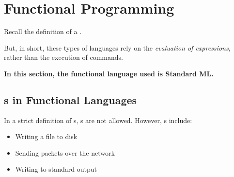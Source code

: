 \section{Functional Programming}\label{sec:Functional_Programming}
Recall the definition of a .

But, in short, these types of languages rely on the \emph{evaluation of expressions}, rather than the execution of commands.

\begin{large}
  \textbf{In this section, the functional language used is Standard ML.}
\end{large}

\subsection{s in Functional Languages}\label{subsec:Functional_Function_Side_Effects}
In a strict definition of s, s are not allowed.
However, s include:
\begin{itemize}[noitemsep]
\item Writing a file to disk
\item Sending packets over the network
\item Writing to standard output
\end{itemize}

